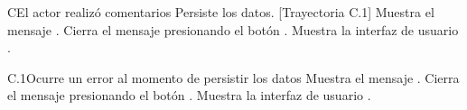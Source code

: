 \begin{UCtrayectoriaA}{C}{El actor realizó comentarios}
    \UCpaso Persiste los datos. [Trayectoria C.1]
    \UCpaso Muestra el mensaje .
    \UCpaso[\UCactor] Cierra el mensaje presionando el botón .
    \UCpaso Muestra la interfaz de usuario .
\end{UCtrayectoriaA}

\begin{UCtrayectoriaA}{C.1}{Ocurre un error al momento de persistir los datos}
    \UCpaso Muestra el mensaje .
    \UCpaso[\UCactor] Cierra el mensaje presionando el botón .
    \UCpaso Muestra la interfaz de usuario .
\end{UCtrayectoriaA}
